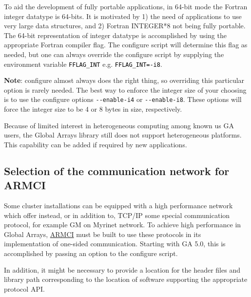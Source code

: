 To aid the development of fully portable applications, in 64-bit mode
the Fortran integer datatype is 64-bits. It is motivated by 1) the
need of applications to use very large data structures, and 2) Fortran
INTEGER{*}8 not being fully portable. The 64-bit representation of
integer datatype is accomplished by using the appropriate Fortran
compiler flag. The configure script will determine this flag as needed,
but one can always override the configure script by supplying the
environment variable \texttt{\textcolor{black}{FFLAG\_INT}} e.g. \texttt{\textcolor{black}{FFLAG\_INT=-i8}}. 

\textbf{Note}: configure almost always does the right thing, so overriding
this particular option is rarely needed. The best way to enforce the
integer size of your choosing is to use the configure options \texttt{-{}-enable-i4}
or \texttt{-{}-enable-i8}. These options will force the integer size
to be 4 or 8 bytes in size, respectively. 

Because of limited interest in heterogeneous computing among known
us GA users, the Global Arrays library still does not support heterogeneous
platforms. This capability can be added if required by new applications. 


\subsection{Selection of the communication network for ARMCI }

Some cluster installations can be equipped with a high performance
network which offer instead, or in addition to, TCP/IP some special
communication protocol, for example GM on Myrinet network. To achieve
high performance in Global Arrays, \href{http://www.emsl.pnl.gov/docs/parsoft/armci}{ARMCI}
must be built to use these protocols in its implementation of one-sided
communication. Starting with GA 5.0, this is accomplished by passing
an option to the configure script. 

In addition, it might be necessary to provide a location for the header
files and library path corresponding to the location of software supporting
the appropriate protocol API. 

